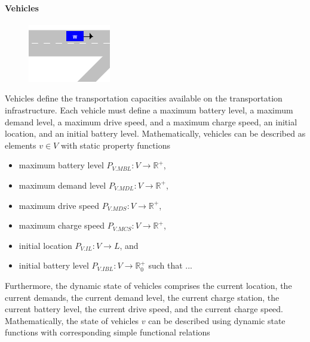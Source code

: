 \documentclass[graybox]{svmult}
\begin{document}
\paragraph{Vehicles}
\begin{figure}
	\centering
		\includegraphics[scale=0.5]{../../concepts/vehicle.png}
\end{figure}
Vehicles define the transportation capacities available on the transportation infrastructure.
Each vehicle must define a maximum battery level, a maximum demand level, a maximum drive speed, and a maximum charge speed, an initial location, and an initial battery level.
Mathematically, vehicles can be described as elements $v \in V$ with static property functions
\begin{itemize}
	\item maximum battery level $P_{V.MBL}: V \rightarrow \mathbb{R}^+$,
	\item maximum demand level $P_{V.MDL}: V \rightarrow \mathbb{R}^+$,
	\item maximum drive speed $P_{V.MDS}: V \rightarrow \mathbb{R}^+$,
	\item maximum charge speed $P_{V.MCS}: V \rightarrow \mathbb{R}^+$,
	\item initial location $P_{V.IL}: V \rightarrow L$, and
	\item initial battery level $P_{V.IBL}: V \rightarrow \mathbb{R}_0^+$ such that ...
\end{itemize}
Furthermore, the dynamic state of vehicles comprises the current location, the current demands, the current demand level, the current charge station, the current battery level, the current drive speed, and the current charge speed.
Mathematically, the state of vehicles $v$ can be described using dynamic state functions with corresponding simple functional relations
\end{document}
